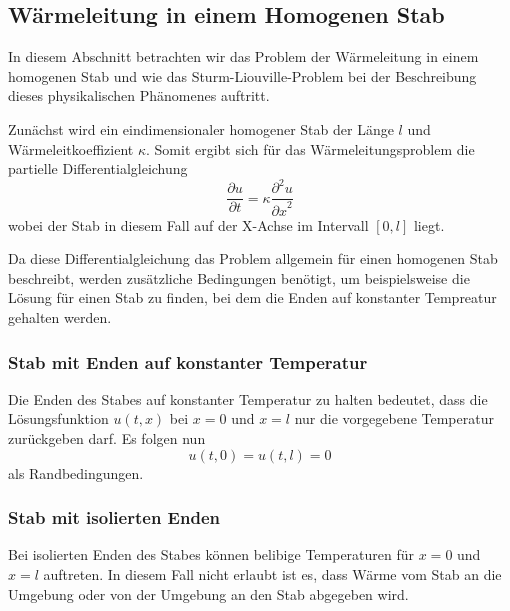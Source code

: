 %
%
%

\subsection{Wärmeleitung in einem Homogenen Stab}

In diesem Abschnitt betrachten wir das Problem der Wärmeleitung in einem
homogenen Stab und wie das Sturm-Liouville-Problem bei der Beschreibung dieses
physikalischen Phänomenes auftritt.

Zunächst wird ein eindimensionaler homogener Stab der Länge $l$ und
Wärmeleitkoeffizient $\kappa$. Somit ergibt sich für das Wärmeleitungsproblem
die partielle Differentialgleichung
\[
    \frac{\partial u}{\partial t} =
    \kappa \frac{\partial^{2}u}{{\partial x}^{2}}
\]
wobei der Stab in diesem Fall auf der X-Achse im Intervall $[0,l]$ liegt.

Da diese Differentialgleichung das Problem allgemein für einen homogenen
Stab beschreibt, werden zusätzliche Bedingungen benötigt, um beispielsweise
die Lösung für einen Stab zu finden, bei dem die Enden auf konstanter 
Tempreatur gehalten werden.


\subsubsection{Stab mit Enden auf konstanter Temperatur}

Die Enden des Stabes auf konstanter Temperatur zu halten bedeutet, dass die
Lösungsfunktion $u(t,x)$ bei $x = 0$ und $x = l$ nur die vorgegebene
Temperatur zurückgeben darf. Es folgen nun
\[
    u(t,0)
    =
    u(t,l)
    =
    0
\]
als Randbedingungen.


\subsubsection{Stab mit isolierten Enden}

Bei isolierten Enden des Stabes können belibige Temperaturen für $x = 0$ und
$x = l$ auftreten. In diesem Fall nicht erlaubt ist es, dass Wärme vom Stab
an die Umgebung oder von der Umgebung an den Stab abgegeben wird.

